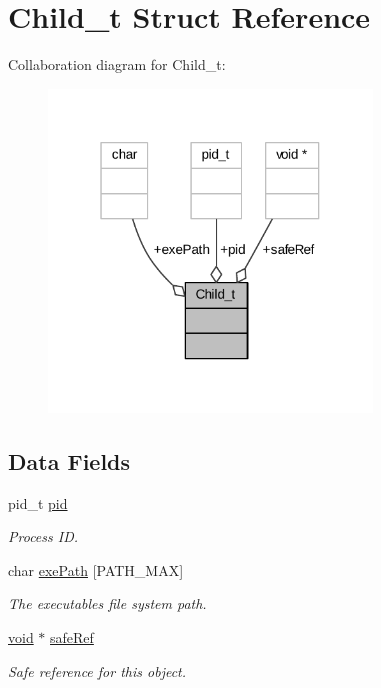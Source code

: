 \hypertarget{struct_child__t}{}\section{Child\+\_\+t Struct Reference}
\label{struct_child__t}


Collaboration diagram for Child\+\_\+t\+:
\nopagebreak
\begin{figure}[H]
\begin{center}
\leavevmode
\includegraphics[width=244pt]{struct_child__t__coll__graph}
\end{center}
\end{figure}
\subsection*{Data Fields}
\begin{DoxyCompactItemize}
\item 
pid\+\_\+t \hyperlink{struct_child__t_ab946263ddf9466b1f73aa1c65dfcecd5}{pid}
\begin{DoxyCompactList}\small\item\em Process ID. \end{DoxyCompactList}\item 
char \hyperlink{struct_child__t_ad9199da1ca5aa7899673a57f82b5f369}{exe\+Path} \mbox{[}P\+A\+T\+H\+\_\+\+M\+AX\mbox{]}
\begin{DoxyCompactList}\small\item\em The executable\textquotesingle{}s file system path. \end{DoxyCompactList}\item 
\hyperlink{_t_e_m_p_l_a_t_e__cdef_8h_ac9c84fa68bbad002983e35ce3663c686}{void} $\ast$ \hyperlink{struct_child__t_a91127a3c90b52b960e545a21a687b7c2}{safe\+Ref}
\begin{DoxyCompactList}\small\item\em Safe reference for this object. \end{DoxyCompactList}\end{DoxyCompactItemize}


